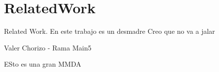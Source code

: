 \section{RelatedWork}

Related Work. En este trabajo es un desmadre Creo que no va a jalar

Valer Chorizo - Rama Main5

ESto es una gran MMDA


